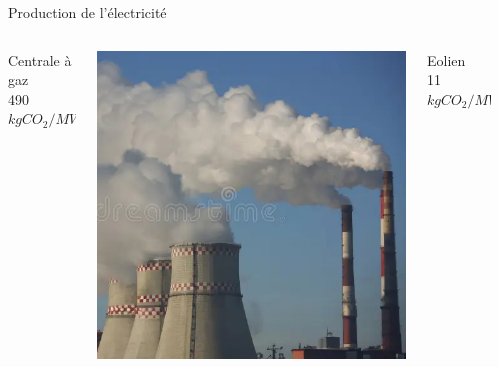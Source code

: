\documentclass{beamer}
\begin{document}
\begin{frame}{Production de l'électricité}
\begin{columns}
\begin{column}{0.2\textwidth}
\end{column}
\end{columns}
\vspace{0.2cm}
\begin{columns}
  \begin{column}{0.26\textwidth}
Centrale à gaz\\
490 $kgCO_2/MWh$
\end{column}
\begin{column}{0.2\textwidth}
\centering
  \includegraphics[scale=0.14]{images/centrale_gaz.png}
\end{column}
\begin{column}{0.25\textwidth}
Eolien\\
11 $kgCO_2/MWh$
\end{column}
\begin{column}{0.2\textwidth}
\centering

\end{column}
\end{columns}
\end{frame}
\end{document}
